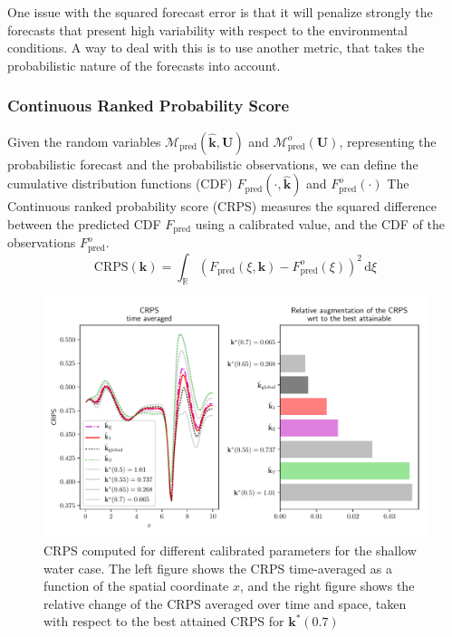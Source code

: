\documentclass[preprint, review, 1p]{elsarticle}
\newcommand{\kest}{\hat{\mathbf{k}}}
\newlength{\onehalfcolumn}
\begin{document}
One issue with the squared forecast error is that it will penalize strongly the forecasts that present high variability with respect to the environmental conditions.
A way to deal with this is to use another metric, that takes the probabilistic nature of the forecasts into account.


\subsubsection{Continuous Ranked Probability Score}
Given the random variables $\mathcal{M}_{\mathrm{pred}}(\kest, \mathbf{U})$ and $\mathcal{M}_{\mathrm{pred}}^o(\mathbf{U})$, representing the probabilistic forecast and the probabilistic observations, we can define the cumulative distribution functions (CDF) $F_{\mathrm{pred}}(\cdot, \kest)$ and $F^o_{\mathrm{pred}}(\cdot)$
The Continuous ranked probability score (CRPS) measures the squared difference between the predicted CDF $F_{\mathrm{pred}}$ using a calibrated value, and the CDF of the observations $F_{\mathrm{pred}}^o$. 
\begin{equation}
\label{eq:def_crps}
\mathrm{CRPS}(\mathbf{k}) = \int_{\mathbb{R}} (F_{\mathrm{pred}}(\xi,\mathbf{k}) - F^o_{\mathrm{pred}}(\xi))^2 \,\mathrm{d}\xi
\end{equation}

\begin{figure}[!h]
  \centering
  \includegraphics[width=\onehalfcolumn]{Figures/FIG14}
  \caption{CRPS computed for different calibrated parameters for the shallow water case. The left figure shows the CRPS time-averaged as a function of the spatial coordinate $x$, and the right figure shows the relative change of the CRPS averaged over time and space, taken with respect to the best attained CRPS for $\mathbf{k}^*(0.7)$}
\label{fig:forecast_crps}
\end{figure}
\end{document}

